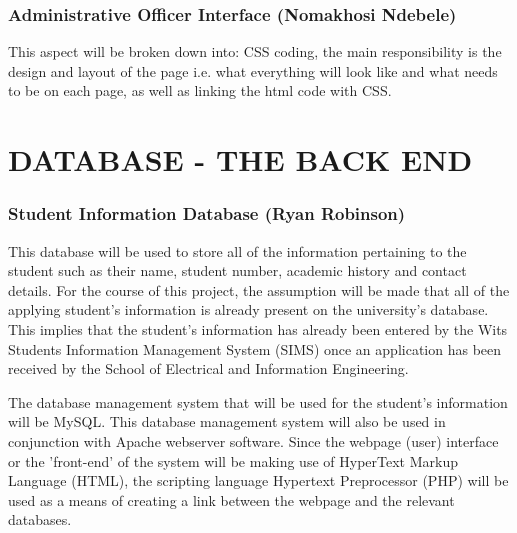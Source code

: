 \documentclass[journal,comsoc]{IEEEtran}
\begin{document}

\subsubsection{Administrative Officer Interface (Nomakhosi Ndebele)}

\hfill \break This aspect will be broken down into: CSS coding, the main responsibility is the design and layout of the page i.e. what everything will look like and what needs to be on each page, as well as linking the html code with CSS.


\section{DATABASE - THE BACK END}


\subsubsection{Student Information Database (Ryan Robinson)}

\hfill \break This database will be used to store all of the information pertaining to the student such as their name, student number, academic history and contact details. For the course of this project, the assumption will be made that all of the applying student's information is already present on the university's database. This implies that the student's information has already been entered by the Wits Students Information Management System (SIMS) once an application has been received by the School of Electrical and Information Engineering. \break

The database management system that will be used for the student's information will be MySQL. This database management system will also be used in conjunction with Apache webserver software. Since the webpage (user) interface or the 'front-end' of the system will be making use of HyperText Markup Language (HTML), the scripting language Hypertext Preprocessor (PHP) will be used as a means of creating a link between the webpage and the relevant databases.
\vspace{2mm}

\end{document}
